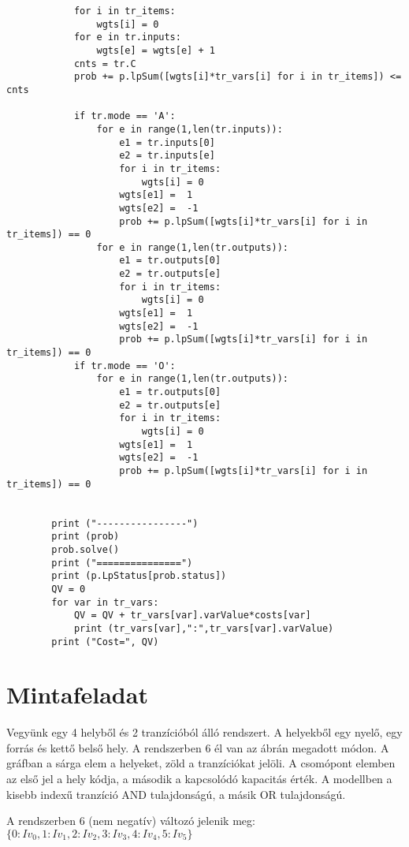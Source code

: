 \begin{verbatim}
            for i in tr_items:
                wgts[i] = 0
            for e in tr.inputs:
                wgts[e] = wgts[e] + 1
            cnts = tr.C
            prob += p.lpSum([wgts[i]*tr_vars[i] for i in tr_items]) <= cnts

            if tr.mode == 'A':
                for e in range(1,len(tr.inputs)):
                    e1 = tr.inputs[0]
                    e2 = tr.inputs[e]
                    for i in tr_items:
                        wgts[i] = 0
                    wgts[e1] =  1
                    wgts[e2] =  -1
                    prob += p.lpSum([wgts[i]*tr_vars[i] for i in tr_items]) == 0
                for e in range(1,len(tr.outputs)):
                    e1 = tr.outputs[0]
                    e2 = tr.outputs[e]
                    for i in tr_items:
                        wgts[i] = 0
                    wgts[e1] =  1
                    wgts[e2] =  -1
                    prob += p.lpSum([wgts[i]*tr_vars[i] for i in tr_items]) == 0
            if tr.mode == 'O':
                for e in range(1,len(tr.outputs)):
                    e1 = tr.outputs[0]
                    e2 = tr.outputs[e]
                    for i in tr_items:
                        wgts[i] = 0
                    wgts[e1] =  1
                    wgts[e2] =  -1
                    prob += p.lpSum([wgts[i]*tr_vars[i] for i in tr_items]) == 0
                    
            
        print ("----------------")
        print (prob)
        prob.solve()
        print ("===============")
        print (p.LpStatus[prob.status])
        QV = 0
        for var in tr_vars:
            QV = QV + tr_vars[var].varValue*costs[var]
            print (tr_vars[var],":",tr_vars[var].varValue)
        print ("Cost=", QV)
\end{verbatim}
\section{Mintafeladat}
Vegyünk egy 4 helyből és 2 tranzícióból álló rendszert. A helyekből egy nyelő, egy forrás és kettő belső hely. A rendszerben 6 él van az ábrán megadott módon.  A gráfban a sárga elem a helyeket, zöld a tranzíciókat jelöli. A csomópont elemben az első jel a hely kódja, a második a kapcsolódó kapacitás érték. A modellben a kisebb indexű tranzíció AND tulajdonságú, a másik OR tulajdonságú. 

A rendszerben 6 (nem negatív) változó jelenik meg:  $\{0: Iv_0, 1: Iv_1, 2: Iv_2, 3: Iv_3, 4: Iv_4, 5: Iv_5\}$


